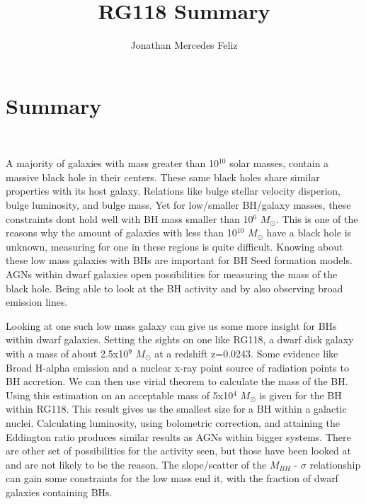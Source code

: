 \documentclass{article}
\title{RG118 Summary}
\author{Jonathan Mercedes Feliz}
\begin{document}
 
\maketitle{}
\section{Summary} 

\
\par A majority of galaxies with mass greater than 10$^{10}$  solar masses, contain a massive black hole in their centers. These same black holes share similar properties with its host galaxy. Relations like bulge stellar velocity disperion, bulge luminosity, and bulge mass. Yet for low/smaller BH/galaxy masses, these constraints dont hold well with BH mass smaller than 10${^6}$ $M_{\odot}$. This is one of the reasons why the amount of galaxies with less than 10$^{10}$ $M_{\odot}$ have a black hole is unknown, measuring for one in these regions is quite difficult. Knowing about these low mass galaxies with BHs are important for BH Seed formation models. AGNs within dwarf galaxies open possibilities for measuring the mass of the black hole. Being able to look at the BH activity and by also observing broad emission lines.
\\
\par Looking at one such low mass galaxy can give us some more insight for BHs within dwarf galaxies. Setting the sights on one like RG118, a dwarf disk galaxy with a mass of about 2.5x10${^9}$ $M_{\odot}$ at a redshift z=0.0243. Some evidence like Broad H-alpha emission and a nuclear x-ray point source of radiation points to BH accretion. We can then use virial theorem to calculate the mass of the BH. Using this estimation on an acceptable mass of 5x10${^4}$ $M_{\odot}$ is given for the BH within RG118. This result gives us the smallest size for a BH within a galactic nuclei. Calculating luminosity, using bolometric correction, and attaining the Eddington ratio produces similar results as AGNs within bigger systems. There are other set of possibilities for the activity seen, but those have been looked at and are not likely to be the reason. The slope/scatter of the $M_{BH}$ - $\sigma$ relationship can gain some constraints for the low mass end it, with the fraction of dwarf galaxies containing BHs.
\end{document}
